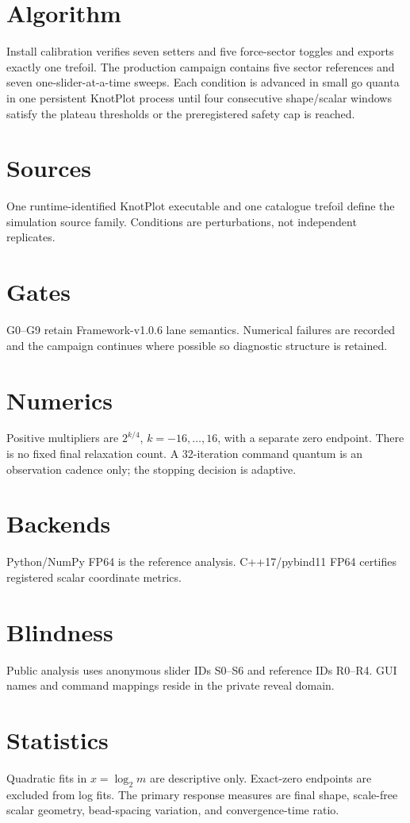 \documentclass[11pt,a4paper]{article}
\begin{document}
\section{Algorithm}
Install calibration verifies seven setters and five force-sector toggles and exports exactly one trefoil. The production campaign contains five sector references and seven one-slider-at-a-time sweeps. Each condition is advanced in small $\mathrm{go}$ quanta in one persistent KnotPlot process until four consecutive shape/scalar windows satisfy the plateau thresholds or the preregistered safety cap is reached.
\section{Sources}
One runtime-identified KnotPlot executable and one catalogue trefoil define the simulation source family. Conditions are perturbations, not independent replicates.
\section{Gates}
G0--G9 retain Framework-v1.0.6 lane semantics. Numerical failures are recorded and the campaign continues where possible so diagnostic structure is retained.
\section{Numerics}
Positive multipliers are $2^{k/4}$, $k=-16,\ldots,16$, with a separate zero endpoint. There is no fixed final relaxation count. A 32-iteration command quantum is an observation cadence only; the stopping decision is adaptive.
\section{Backends}
Python/NumPy FP64 is the reference analysis. C++17/pybind11 FP64 certifies registered scalar coordinate metrics.
\section{Blindness}
Public analysis uses anonymous slider IDs S0--S6 and reference IDs R0--R4. GUI names and command mappings reside in the private reveal domain.
\section{Statistics}
Quadratic fits in $x=\log_2m$ are descriptive only. Exact-zero endpoints are excluded from log fits. The primary response measures are final shape, scale-free scalar geometry, bead-spacing variation, and convergence-time ratio.
\end{document}
